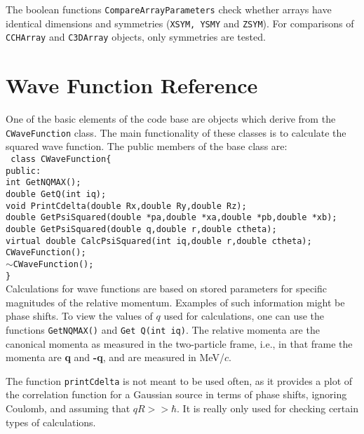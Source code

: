 \documentclass[10pt]{article}
\def\tab{\hspace*{9pt}}
\begin{document}
The boolean functions {\tt CompareArrayParameters} check whether arrays have identical dimensions and symmetries ({\tt XSYM, YSMY} and {\tt ZSYM}). For comparisons of {\tt CCHArray} and {\tt C3DArray} objects, only symmetries are tested.


\section{Wave Function Reference}

One of the basic elements of the code base are objects which derive from the {\tt CWaveFunction} class. The main functionality of these classes is to calculate the squared wave function. The public members of the base class are:\\

{\tt
class CWaveFunction\{\\
\tab public:\\
\tab \tab int GetNQMAX();\\
\tab \tab double GetQ(int iq);\\
\tab \tab void PrintCdelta(double Rx,double Ry,double Rz);\\
\tab \tab double GetPsiSquared(double *pa,double *xa,double *pb,double *xb);\\
\tab \tab double GetPsiSquared(double q,double r,double ctheta);\\
\tab \tab virtual double CalcPsiSquared(int iq,double r,double ctheta);\\
\tab \tab CWaveFunction();\\
\tab \tab $\sim$CWaveFunction();\\
\}\\ }
Calculations for wave functions are based on stored parameters for specific magnitudes of the relative momentum. Examples of such information might be phase shifts. To view the values of $q$ used for calculations, one can use the functions {\tt GetNQMAX()} and {\tt Get Q(int iq)}. The relative momenta are the canonical momenta as measured in the two-particle frame, i.e., in that frame the momenta are {\bf q} and {\bf -q}, and are measured in MeV/$c$.

The function {\tt printCdelta} is not meant to be used often, as it provides a plot of the correlation function for a Gaussian source in terms of phase shifts, ignoring Coulomb, and assuming that $qR>>\hbar$. It is really only used for checking certain types of calculations.
\end{document}
